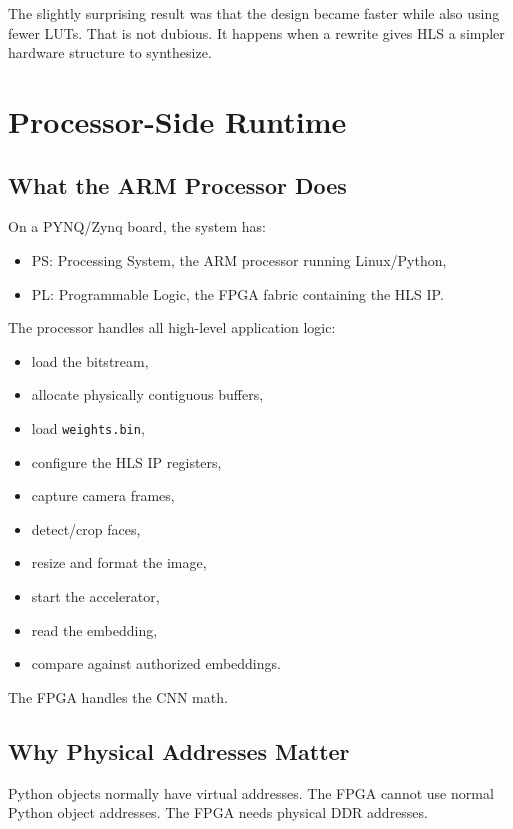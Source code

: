 \documentclass[11pt]{article}
\newcommand{\code}[1]{\texttt{#1}}
\begin{document}
The slightly surprising result was that the design became faster while also using fewer LUTs.
That is not dubious.
It happens when a rewrite gives HLS a simpler hardware structure to synthesize.

\section{Processor-Side Runtime}

\subsection{What the ARM Processor Does}

On a PYNQ/Zynq board, the system has:

\begin{itemize}[leftmargin=1.4em]
  \item PS: Processing System, the ARM processor running Linux/Python,
  \item PL: Programmable Logic, the FPGA fabric containing the HLS IP.
\end{itemize}

The processor handles all high-level application logic:

\begin{itemize}[leftmargin=1.4em]
  \item load the bitstream,
  \item allocate physically contiguous buffers,
  \item load \code{weights.bin},
  \item configure the HLS IP registers,
  \item capture camera frames,
  \item detect/crop faces,
  \item resize and format the image,
  \item start the accelerator,
  \item read the embedding,
  \item compare against authorized embeddings.
\end{itemize}

The FPGA handles the CNN math.

\subsection{Why Physical Addresses Matter}

Python objects normally have virtual addresses.
The FPGA cannot use normal Python object addresses.
The FPGA needs physical DDR addresses.
\end{document}
